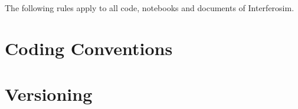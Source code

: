 
The following rules apply to all code, notebooks and documents of
Interferosim.

\section{Coding Conventions}


\section{Versioning}

